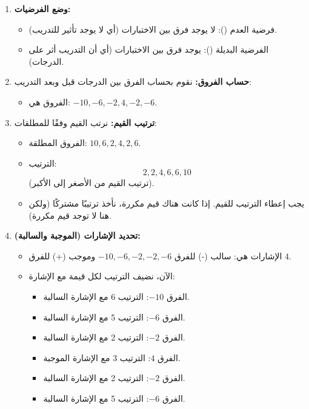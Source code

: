 \begin{enumerate}
	\item \textbf{وضع الفرضيات:}
	\begin{itemize}
		\item فرضية العدم (): لا يوجد فرق بين الاختبارات (أي لا يوجد تأثير للتدريب).
		\item الفرضية البديلة (): يوجد فرق بين الاختبارات (أي أن التدريب أثر على الدرجات).
	\end{itemize}
	
	\item \textbf{حساب الفروق:}
	نقوم بحساب الفرق بين الدرجات قبل وبعد التدريب:
	\begin{itemize}
		\item الفروق هي: \(-10, -6, -2, 4, -2, -6\).
	\end{itemize}
	
	\item \textbf{ترتيب القيم:}
	نرتب القيم وفقًا للمطلقات:
	\begin{itemize}
		\item الفروق المطلقة: \(10, 6, 2, 4, 2, 6\).
		\item الترتيب: \[ 2, 2, 4, 6, 6, 10 \] (ترتيب القيم من الأصغر إلى الأكبر).
		\item يجب إعطاء الترتيب للقيم. إذا كانت هناك قيم مكررة، نأخذ ترتيبًا مشتركًا (ولكن هنا لا توجد قيم مكررة).
	\end{itemize}
	
	\item \textbf{تحديد الإشارات (الموجبة والسالبة):}
	\begin{itemize}
		\item الإشارات هي: سالب (-) للفرق \(-10, -6, -2, -2, -6\) وموجب (+) للفرق \( 4 \).
		\item الآن، نضيف الترتيب لكل قيمة مع الإشارة:
		\begin{itemize}
			\item الفرق \(-10\): الترتيب 6 مع الإشارة السالبة.
			\item الفرق \(-6\): الترتيب 5 مع الإشارة السالبة.
			\item الفرق \(-2\): الترتيب 2 مع الإشارة السالبة.
			\item الفرق \(4\): الترتيب 3 مع الإشارة الموجبة.
			\item الفرق \(-2\): الترتيب 2 مع الإشارة السالبة.
			\item الفرق \(-6\): الترتيب 5 مع الإشارة السالبة.
		\end{itemize}
	\end{itemize}
	

\end{enumerate}
